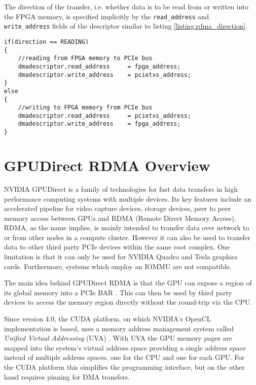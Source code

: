 The direction of the transfer, i.e. whether data is to be read from or written into the FPGA memory, is specified implicitly by the \texttt{read\_address} and \texttt{write\_address} fields of the descriptor similar to listing \ref{listing:rdma_direction}.

\begin{lstlisting}[label=listing:rdma_direction, caption=Selection of the transfer direction ]
if(direction == READING)
{
	//reading from FPGA memory to PCIe bus
	dmadescriptor.read_address     = fpga_address;
	dmadescriptor.write_address    = pcietxs_address;
}
else
{
	//writing to FPGA memory from PCIe bus
	dmadescriptor.read_address     = pcietxs_address;
	dmadescriptor.write_address    = fpga_address;
}
\end{lstlisting}



\section{GPUDirect RDMA Overview}
\label{section:rdmaoverview}

NVIDIA GPUDirect \cite{gpudirect} is a family of technologies for fast data transfers in high performance computing systems with multiple devices.
Its key features include  an accelerated pipeline for video capture devices, storage devices, peer to peer memory access between GPUs and RDMA (Remote Direct Memory Access).
RDMA, as the name implies, is mainly intended to transfer data over network to or from other nodes in a compute cluster.
However it can also be used to transfer data to other third party PCIe devices within the same root complex.
One limitation is that it can only be used for NVIDIA Quadro and Tesla graphics cards.
Furthermore, systems which employ an IOMMU are not compatible.


The main idea behind GPUDirect RDMA is that the GPU can expose a region of its global memory into a PCIe BAR \cite{rdma}.
This can then be used by third party devices to access the memory region directly without the round-trip via the CPU.

Since version 4.0, the CUDA platform, on which NVIDIA's OpenCL implementation is based, uses a memory address management system called \emph{Unified Virtual Addressing} (UVA) \cite{cudaguide, rdma}.
With UVA the GPU memory pages are mapped into the system's virtual address space providing a single address space instead of multiple address spaces, one for the CPU and one for each GPU.
For the CUDA platform this simplifies the programming interface, but on the other hand requires pinning for DMA transfers. 


